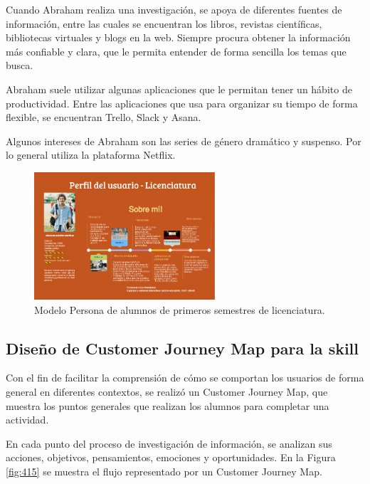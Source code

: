 Cuando Abraham realiza una investigación, se apoya de diferentes fuentes de información, entre las cuales se encuentran los libros, revistas científicas, bibliotecas virtuales y blogs en la web. Siempre procura obtener la información más confiable y clara, que le permita entender de forma sencilla los temas que busca.

Abraham suele utilizar algunas aplicaciones que le permitan tener un hábito de productividad. Entre las aplicaciones que usa para organizar su tiempo de forma flexible, se encuentran Trello, Slack y Asana.

Algunos intereses de Abraham son las series de género dramático y suspenso. Por lo general utiliza la plataforma Netflix.

\begin{figure}[H]
  \centering
  \includegraphics[width=0.60\textwidth]{Cap4/Figuras/Lic.png}
  \caption{Modelo Persona de alumnos de primeros semestres de licenciatura.}
  \label{fig:414}
\end{figure}


\subsection{Diseño de Customer Journey Map para la skill}
\label{DisenioCustomerJourneyMapSkillcapIV}

Con el fin de facilitar la comprensión de cómo se comportan los usuarios de forma general en diferentes contextos, se realizó un Customer Journey Map, que muestra los puntos generales que realizan los alumnos para completar una actividad.

En cada punto del proceso de investigación de información, se analizan sus acciones, objetivos, pensamientos, emociones y oportunidades. En la Figura \ref{fig:415} se muestra el flujo representado por un Customer Journey Map.

